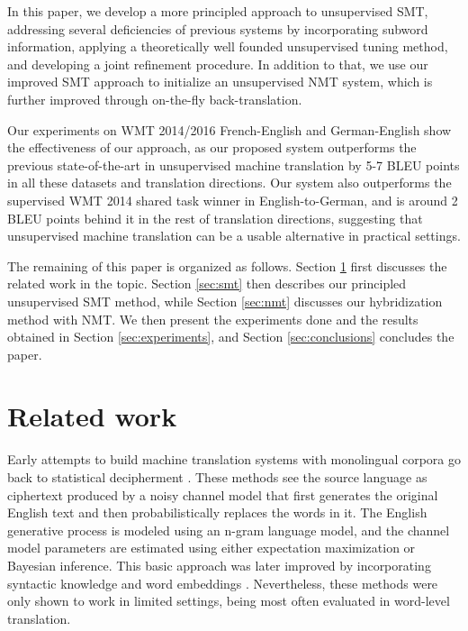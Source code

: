 \documentclass[11pt,a4paper]{article}
\begin{document}
In this paper, we develop a more principled approach to unsupervised SMT, addressing several deficiencies of previous systems by incorporating subword information, applying a theoretically well founded unsupervised tuning method, and developing a joint refinement procedure. In addition to that, we use our improved SMT approach to initialize an unsupervised NMT system, which is further improved through on-the-fly back-translation.

Our experiments on WMT 2014/2016 French-English and German-English show the effectiveness of our approach, as our proposed system outperforms the previous state-of-the-art in unsupervised machine translation by 5-7 BLEU points in all these datasets and translation directions. Our system also outperforms the supervised WMT 2014 shared task winner in English-to-German, and is around 2 BLEU points behind it in the rest of translation directions, suggesting that unsupervised machine translation can be a usable alternative in practical settings.

The remaining of this paper is organized as follows. Section \ref{sec:related} first discusses the related work in the topic. Section \ref{sec:smt} then describes our principled unsupervised SMT method, while Section \ref{sec:nmt} discusses our hybridization method with NMT. We then present the experiments done and the results obtained in Section \ref{sec:experiments}, and Section \ref{sec:conclusions} concludes the paper.


\section{Related work}
\label{sec:related}

Early attempts to build machine translation systems with monolingual corpora go back to statistical decipherment \citep{ravi2011deciphering,dou2012large}. These methods see the source language as ciphertext produced by a noisy channel model that first generates the original English text and then probabilistically replaces the words in it. The English generative process is modeled using an n-gram language model, and the channel model parameters are estimated using either expectation maximization or Bayesian inference. This basic approach was later improved by incorporating syntactic knowledge \citep{dou2013dependency} and word embeddings \citep{dou2015unifying}. Nevertheless, these methods were only shown to work in limited settings, being most often evaluated in word-level translation.
\end{document}
